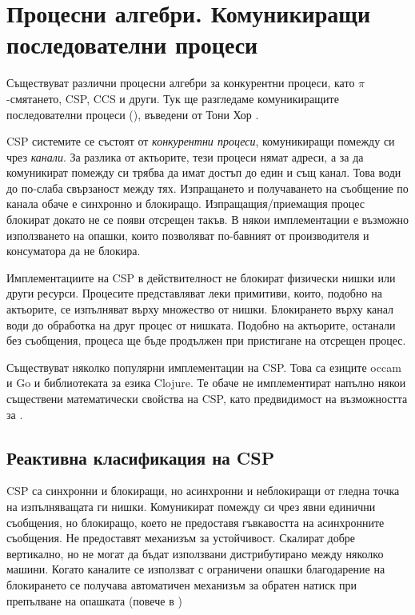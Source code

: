 \section{Процесни алгебри. Комуникиращи последователни процеси}

Съществуват различни процесни алгебри за конкурентни процеси, като $\pi$-смятането, CSP, CCS и други. Тук ще разгледаме комуникиращите последователни процеси (), въведени от Тони Хор \cite{hoare1978CSP}.

CSP системите се състоят от \emph{конкурентни процеси}, комуникиращи помежду си чрез \emph{канали}. За разлика от актьорите, тези процеси нямат адреси, а за да комуникират помежду си трябва да имат достъп до един и същ канал. Това води до по-слаба свързаност между тях. Изпращането и получаването на съобщение по канала обаче е синхронно и блокиращо. Изпращащия/приемащия процес блокират докато не се появи отсрещен такъв. В някои имплементации е възможно използването на опашки, които позволяват по-бавният от производителя и консуматора да не блокира.

Имплементациите на CSP в действителност не блокират физически нишки или други ресурси. Процесите представляват леки примитиви, които, подобно на актьорите, се изпълняват върху множество от нишки. Блокирането върху канал води до обработка на друг процес от нишката. Подобно на актьорите, останали без съобщения, процеса ще бъде продължен при пристигане на отсрещен процес.

Съществуват няколко популярни имплементации на CSP. Това са езиците occam и Go и библиотеката  за езика Clojure. Те обаче не имплементират напълно някои съществени математически свойства на CSP, като предвидимост на възможността за .
\subsection{Реактивна класификация на CSP}

CSP са синхронни и блокиращи, но асинхронни и неблокиращи от гледна точка на изпълняващата ги нишки. Комуникират помежду си чрез явни единични съобщения, но блокиращо, което не предоставя гъвкавостта на асинхронните съобщения. Не предоставят механизъм за устойчивост. Скалират добре вертикално, но не могат да бъдат използвани дистрибутирано между няколко машини. Когато каналите се използват с ограничени опашки благодарение на блокирането се получава автоматичен механизъм за обратен натиск при препълване на опашката (повече в )

